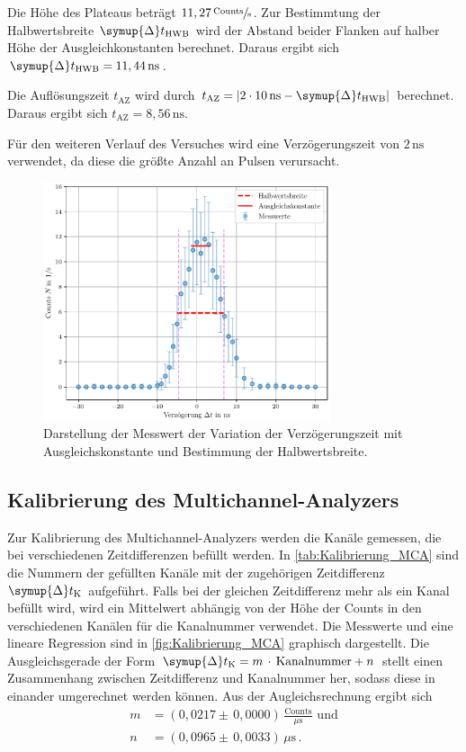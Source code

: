 Die Höhe des Plateaus beträgt $11,27 \, \sfrac{\text{Counts}}{\unit{\second}}$.
Zur Bestimmtung der Halbwertsbreite $\symup{\Delta} t_{\text{HWB}}$ wird der Abstand 
beider Flanken auf halber Höhe der Ausgleichkonstanten berechnet.
Daraus ergibt sich $\symup{\Delta} t_{\text{HWB}} = 11,44 \, \unit{\nano\second}$. 

Die Auflösungszeit $t_{\text{AZ}}$ wird durch  
$t_{\text{AZ}} = |2 \cdot 10 \, \unit{\nano\second}-\symup{\Delta} t_{\text{HWB}}|$ berechnet.
Daraus ergibt sich $t_{\text{AZ}} = 8,56 \, \unit{\nano\second}$.

Für den weiteren Verlauf des Versuches wird eine Verzögerungszeit von $2 \,\unit{\nano\second}$ verwendet, da diese die 
größte Anzahl an Pulsen verursacht.
\begin{figure}
  \centering
  \includegraphics[width=0.75\textwidth]{Verzoegerung.pdf}
  \caption{Darstellung der Messwert der Variation der Verzögerungszeit mit Ausgleichskonstante und Bestimmung der Halbwertsbreite.}
  \label{fig:Verzoegerung}
\end{figure}
\FloatBarrier

\subsection{Kalibrierung des Multichannel-Analyzers}

Zur Kalibrierung des Multichannel-Analyzers werden die Kanäle 
gemessen, die bei verschiedenen Zeitdifferenzen befüllt werden. 
In \autoref{tab:Kalibrierung_MCA} sind die Nummern der
 gefüllten Kanäle mit der zugehörigen Zeitdifferenz 
 $\symup{\Delta} t_{\text{K}}$ aufgeführt. Falls bei der gleichen Zeitdifferenz 
 mehr als ein Kanal befüllt wird, wird ein Mittelwert abhängig 
 von der Höhe der Counts in den verschiedenen Kanälen für 
 die Kanalnummer verwendet. Die Messwerte und eine lineare Regression 
 sind in \autoref{fig:Kalibrierung_MCA} graphisch dargestellt. 
 Die Ausgleichsgerade der Form $\symup{\Delta} t_{\text{K}} = m \, \cdot \,\text{Kanalnummer} + n$
 stellt einen Zusammenhang zwischen Zeitdifferenz und Kanalnummer her, 
 sodass diese in einander umgerechnet werden können. 
 Aus der Augleichsrechnung ergibt sich 
 \begin{align*}
 m &= (0,0217 \pm \, 0,0000) \, \frac{\text{Counts}}{\unit{\mu\second}}\, \, \text{und} \\
 n &= (0,0965 \pm \, 0,0033) \, \unit{\mu\second} \,. 
 \end{align*}

